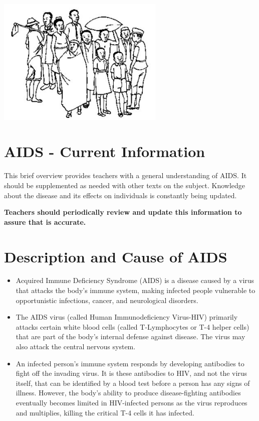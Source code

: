 \begin{center}
\includegraphics[width=0.6\textwidth]{./img/source/aids-1.jpg}
\end{center}

\section{AIDS - Current Information}

This brief overview provides teachers with a general understanding of AIDS. It should be
supplemented as needed with other texts on the subject. Knowledge about the disease and
its effects on individuals is constantly being updated.

\noindent \textbf{Teachers should periodically review and update this information to assure that is
accurate.}

\section{Description and Cause of AIDS}

\begin{itemize}
\item Acquired Immune Deficiency Syndrome (AIDS) is a disease caused by a virus that
attacks the body's immune system, making infected people vulnerable to opportunistic
infections, cancer, and neurological disorders.
\item The AIDS virus (called Human Immunodeficiency Virus-HIV) primarily attacks certain
white blood cells (called T-Lymphocytes or T-4 helper cells) that are part of the body's
internal defense against disease. The virus may also attack the central nervous system.
\item An infected person's immune system responds by developing antibodies to fight off the
invading virus. It is these antibodies to HIV, and not the virus itself, that can be identified
by a blood test before a person has any signs of illness. However, the body's ability to
produce disease-fighting antibodies eventually becomes limited in HIV-infected persons as
the virus reproduces and multiplies, killing the critical T-4 cells it has infected.
\end{itemize}

